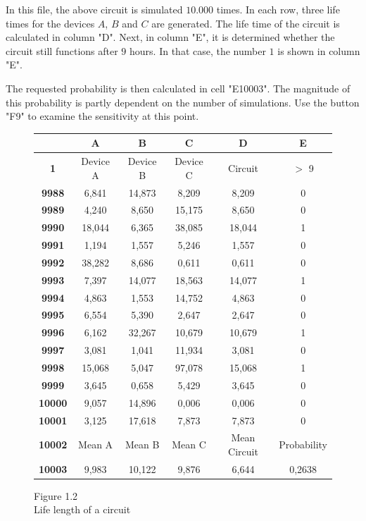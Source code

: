 In this file, the above circuit is simulated $10.000$ times. 
In each row, three life times for the devices $A$, $B$ and $C$ are generated. 
The life time of the circuit is calculated in column "D".
Next, in column "E", it is determined whether the circuit still functions after $9$ hours. 
In that case, the number $1$ is shown in column "E".

The requested probability is then calculated in cell "E10003".
The magnitude of this probability is partly dependent on the number of simulations. 
Use the button "F9" to examine the sensitivity at this point.

\begin{figure}[h]
    \centering
    \begin{tabular}{|c|c|c|c|c|c|}
        \toprule
            & \textbf{A} & \textbf{B} & \textbf{C} & \textbf{D} & \textbf{E} \\ 
        \midrule
            \textbf{1} & Device A & Device B & Device C & Circuit & $>$ 9 \\ \midrule
            \textbf{9988} & 6,841 & 14,873 & 8,209 & 8,209 & 0 \\ \midrule
            \textbf{9989} & 4,240 & 8,650 & 15,175 & 8,650 & 0 \\ \midrule
            \textbf{9990} & 18,044 & 6,365 & 38,085 & 18,044 & 1 \\ \midrule
            \textbf{9991} & 1,194 & 1,557 & 5,246 & 1,557 & 0 \\ \midrule
            \textbf{9992} & 38,282 & 8,686 & 0,611 & 0,611 & 0 \\ \midrule
            \textbf{9993} & 7,397 & 14,077 & 18,563 & 14,077 & 1 \\ \midrule
            \textbf{9994} & 4,863 & 1,553 & 14,752 & 4,863 & 0 \\ \midrule
            \textbf{9995} & 6,554 & 5,390 & 2,647 & 2,647 & 0 \\ \midrule
            \textbf{9996} & 6,162 & 32,267 & 10,679 & 10,679 & 1 \\ \midrule
            \textbf{9997} & 3,081 & 1,041 & 11,934 & 3,081 & 0 \\ \midrule
            \textbf{9998} & 15,068 & 5,047 & 97,078 & 15,068 & 1 \\ \midrule
            \textbf{9999} & 3,645 & 0,658 & 5,429 & 3,645 & 0 \\ \midrule
            \textbf{10000} & 9,057 & 14,896 & 0,006 & 0,006 & 0 \\ \midrule
            \textbf{10001} & 3,125 & 17,618 & 7,873 & 7,873 & 0 \\ \midrule
            \textbf{10002} & Mean A & Mean B & Mean C & Mean Circuit & Probability \\ \midrule
            \textbf{10003} & 9,983 & 10,122 & 9,876 & 6,644 & 0,2638 \\ 
        \bottomrule
        \end{tabular}
    \caption*{Figure 1.2 \\ Life length of a circuit}
\end{figure}

